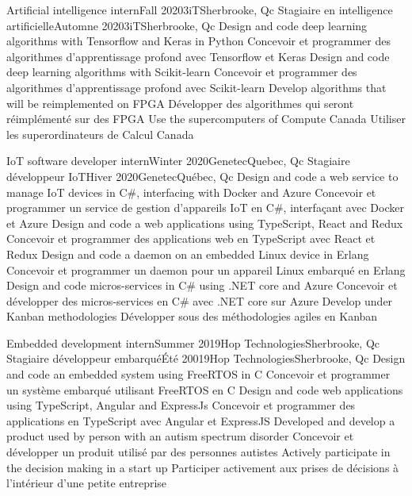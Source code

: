 \documentclass[letterpaper,11pt]{resume}
\begin{document}
    \resumeSubheadingEnFr
        {Artificial intelligence intern}{Fall 2020}{3iT}{Sherbrooke, Qc}
        {Stagiaire en intelligence artificielle}{Automne 2020}{3iT}{Sherbrooke, Qc}
            \resumeItemEnFr
                {Design and code deep learning algorithms with Tensorflow and Keras in Python}
                {Concevoir et programmer des algorithmes d'apprentissage profond avec Tensorflow et Keras}
            \resumeItemEnFr
                {Design and code deep learning algorithms with Scikit-learn}
                {Concevoir et programmer des algorithmes d'apprentissage profond avec Scikit-learn}
            \resumeItemEnFr
                {Develop algorithms that will be reimplemented on FPGA}
                {Développer des algorithmes qui seront réimplémenté sur des FPGA}
            \resumeItemEnFr
                {Use the supercomputers of Compute Canada}
                {Utiliser les superordinateurs de Calcul Canada}
        
    \resumeSubheadingEnFr
        {IoT software developer intern}{Winter 2020}{Genetec}{Quebec, Qc}
        {Stagiaire développeur IoT}{Hiver 2020}{Genetec}{Québec, Qc}
            \resumeItemEnFr
                {Design and code a web service to manage IoT devices in C\#, interfacing with Docker and Azure}
                {Concevoir et programmer un service de gestion d'appareils IoT en C\#, interfaçant avec Docker et Azure}
            \resumeItemEnFr
                {Design and code a web applications using TypeScript, React and Redux}
                {Concevoir et programmer des applications web en TypeScript avec React et Redux}
            \resumeItemEnFr
                {Design and code a daemon on an embedded Linux device in Erlang}
                {Concevoir et programmer un \«daemon\» pour un appareil Linux embarqué en Erlang}
            \resumeItemEnFr
                {Design and code micros-services in C\# using .NET core and Azure}
                {Concevoir et développer des micros-services en C\# avec .NET core sur Azure}
            \resumeItemEnFr
                {Develop under Kanban methodologies}
                {Développer sous des méthodologies agiles en Kanban}

    \resumeSubheadingEnFr
      {Embedded development intern}{Summer 2019}{Hop Technologies}{Sherbrooke, Qc}
      {Stagiaire développeur embarqué}{Été 20019}{Hop Technologies}{Sherbrooke, Qc}
            \resumeItemEnFr
                {Design and code an embedded system using FreeRTOS in C}
                {Concevoir et programmer un système embarqué utilisant FreeRTOS en C}
            \resumeItemEnFr
                {Design and code web applications using TypeScript, Angular and ExpressJs}
                {Concevoir et programmer des applications en TypeScript avec Angular et ExpressJS}
            \resumeItemEnFr
                {Developed and develop a product used by person with an autism spectrum disorder}
                {Concevoir et développer un produit utilisé par des personnes autistes}
            \resumeItemEnFr
                {Actively participate in the decision making in a start up}
                {Participer activement aux prises de décisions à l'intérieur d'une petite entreprise}
\end{document}
